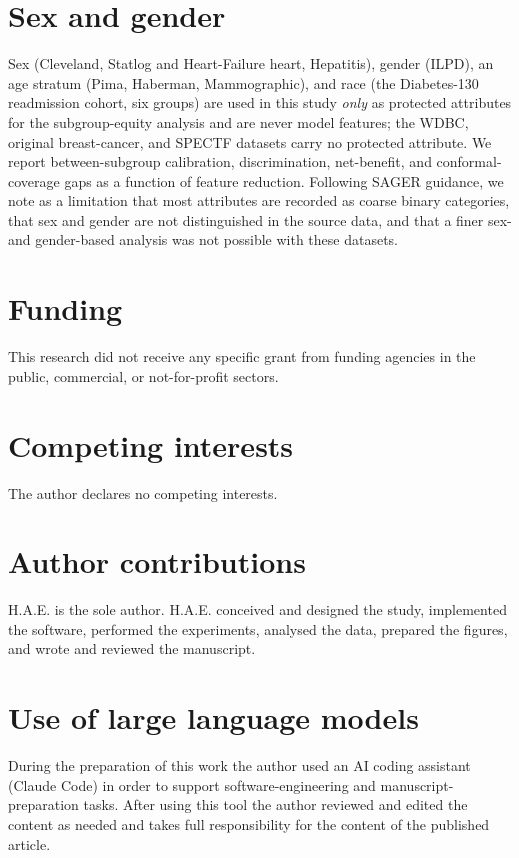 \documentclass[fleqn,10pt]{wlscirep}
\begin{document}
\section*{Sex and gender}
Sex (Cleveland, Statlog and Heart-Failure heart, Hepatitis), gender (ILPD), an age stratum (Pima,
Haberman, Mammographic), and race (the Diabetes-130 readmission cohort, six groups) are used in this
study \emph{only} as protected attributes for the subgroup-equity analysis and are never model
features; the WDBC, original breast-cancer, and SPECTF datasets carry no protected attribute. We
report between-subgroup calibration, discrimination, net-benefit, and conformal-coverage gaps as a
function of feature reduction. Following SAGER guidance, we note as a limitation that most attributes
are recorded as coarse binary categories, that sex and gender are not distinguished in the source
data, and that a finer sex- and gender-based analysis was not possible with these datasets.

\section*{Funding}
This research did not receive any specific grant from funding agencies in the public, commercial, or
not-for-profit sectors.

\section*{Competing interests}
The author declares no competing interests.

\section*{Author contributions}
H.A.E. is the sole author. H.A.E. conceived and designed the study, implemented the software, performed
the experiments, analysed the data, prepared the figures, and wrote and reviewed the manuscript.

\section*{Use of large language models}
During the preparation of this work the author used an AI coding assistant (Claude Code) in order to
support software-engineering and manuscript-preparation tasks. After using this tool the author
reviewed and edited the content as needed and takes full responsibility for the content of the
published article.
\end{document}
